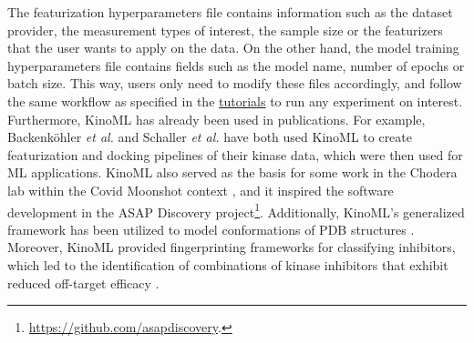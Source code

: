 \documentclass[9pt,lessons, pubversion]{livecoms}
\begin{document}
The featurization hyperparameters file contains information such as the dataset provider, the measurement types of interest, the sample size or the featurizers that the user wants to apply on the data. On the other hand, the model training hyperparameters file contains fields such as the model name, number of epochs or batch size. This way, users only need to modify these files accordingly, and follow the same workflow as specified in the \href{https://github.com/openkinome/kinoml/tree/master/tutorials/experiments}{tutorials} to run any experiment on interest.\\

Furthermore, KinoML has already been used in  publications. For example, Backenk\"ohler \textit{et al.} \cite{backenkohler2023guided} and Schaller \textit{et al.} \cite{schaller2023benchmarking} have both used KinoML to create featurization and docking pipelines of their kinase data, which were then used for ML applications. 
KinoML also served as the basis for some work in the Chodera lab within the Covid Moonshot context \cite{Boby2023}, and it inspired the software development in the ASAP Discovery project\footnote{\href{https://github.com/asapdiscovery}{https://github.com/asapdiscovery}.}. Additionally, KinoML's generalized framework has been utilized to model conformations of PDB structures \cite{Perner2023}. Moreover, KinoML provided fingerprinting frameworks for classifying inhibitors, which led to the identification of combinations of kinase inhibitors that exhibit reduced off-target efficacy \cite{Outhwaite2023}.

\end{document}
